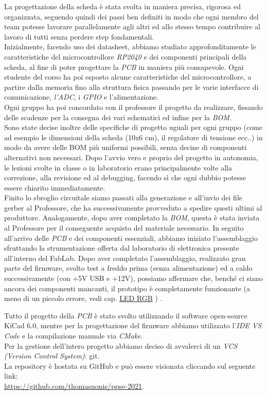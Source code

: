 La progettazione della scheda è stata svolta in maniera precisa,
rigorosa ed organizzata, seguendo quindi dei passi ben definiti in modo
che ogni membro del team potesse lavorare parallelamente agli altri ed
allo stesso tempo contribuire al lavoro di tutti senza perdere step
fondamentali.\\
Inizialmente, facendo uso dei datasheet, abbiamo studiato
approfonditamente le caratteristiche del microcontrollore \emph{RP2040}
e dei componenti principali della scheda, al fine di poter progettare la
\emph{PCB} in maniera più consapevole. Ogni studente del corso ha poi
esposto alcune caratteristiche del microcontrollore, a partire dalla
memoria fino alla struttura fisica passando per le varie interfacce di
comunicazione, \emph{l'ADC}, i \emph{GPIO} e l'alimentazione.\\
Ogni gruppo ha poi concordato con il professore il progetto da
realizzare, fissando delle scadenze per la consegna dei vari schematici
ed infine per la \emph{BOM}.\\
Sono state decise inoltre delle specifiche di progetto uguali per ogni
gruppo (come ad esempio le dimensioni della scheda (10x6 cm), il
regolatore di tensione ecc..) in modo da avere delle BOM più uniformi
possibili, senza decine di componenti alternativi non necessari. Dopo
l'avvio vero e proprio del progetto in autonomia, le lezioni svolte in
classe o in laboratorio erano principalmente volte alla correzione, alla
revisione ed al debugging, facendo sì che ogni dubbio potesse essere
chiarito immediatamente.\\
Finito lo sbroglio circuitale siamo passati alla generazione e all'invio
dei file gerber al Professore, che ha successivamente provveduto a
spedire questi ultimi al produttore. Analogamente, dopo aver completato
la \emph{BOM}, questa è stata inviata al Professore per il conseguente
acquisto del materiale necessario. In seguito all'arrivo delle
\emph{PCB} e dei componenti essenziali, abbiamo iniziato l'assemblaggio
sfruttando la strumentazione offerta dal laboratorio di elettronica
presente all'interno del FabLab. Dopo aver completato l'assemblaggio,
realizzato gran parte del firmware, svolto test a freddo prima (senza
alimentazione) ed a caldo successivamente (con +5V USB e +12V), possiamo
affermare che, benché ci siano ancora dei componenti mancanti, il
prototipo è completamente funzionante (a meno di un piccolo errore, vedi
cap. \protect\hyperlink{led-rgb}{\underline{LED RGB}} ) .

Tutto il progetto della \emph{PCB} è stato svolto utilizzando il
software open-source KiCad 6.0, mentre per la progettazione del firmware
abbiamo utilizzato l'\emph{IDE VS Code} e la compilazione manuale via
\emph{CMake}.\\
Per la gestione dell'intero progetto abbiamo deciso di avvalerci di un
\emph{VCS (Version Control System)}: git.\\
La repository è hostata su GitHub e può essere visionata cliccando sul
seguente link:\\
\href{https://github.com/thomasnonis/ppse-2021}{\underline{https://github.com/thomasnonis/ppse-2021}}.
